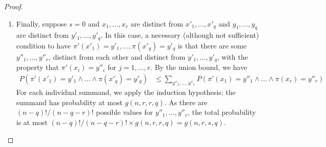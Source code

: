 \begin{proof}
\begin{enumerate}
\item Finally, suppose $s = 0$ and $x_1, \dots, x_r$ are distinct from $x'_1, \dots, x'_q$ and $y_1, \dots, y_q$ are distinct from $y'_1, \dots, y'_q$.  In this case, a necessary (although not sufficient) condition to have $\pi'(x'_1) = y'_1,  \dots,  \pi(x'_q) = y'_q$ is that there are some $y''_1, \dots, y''_r$, distinct from each other and distinct from $y'_1, \dots,  y'_q$, with the property that $\pi'(x_i) = y''_i$ for $j = 1, \dots, r$. By the union bound, we have
\begin{align*}
P(\pi'(x'_1) = y'_1 \wedge \dots \wedge \pi(x'_q) = y'_q)
& \leq \sum_{y''_{1}, \dots, y''_r} P(\pi'(x_1) = y''_1 \wedge \dots \wedge \pi(x_r) = y''_r)
\end{align*}
For each individual summand, we apply the induction hypothesis; the summand has probability at most $g(n,r,r,q)$. As there are $(n-q)!/(n-q-r)!$ possible values for $y''_1, \dots, y''_r$, the total probability is at most $(n-q)!/(n-q-r)! \times g(n,r,r,q) = g(n,r,s,q)$.
\end{enumerate}
\end{proof}

